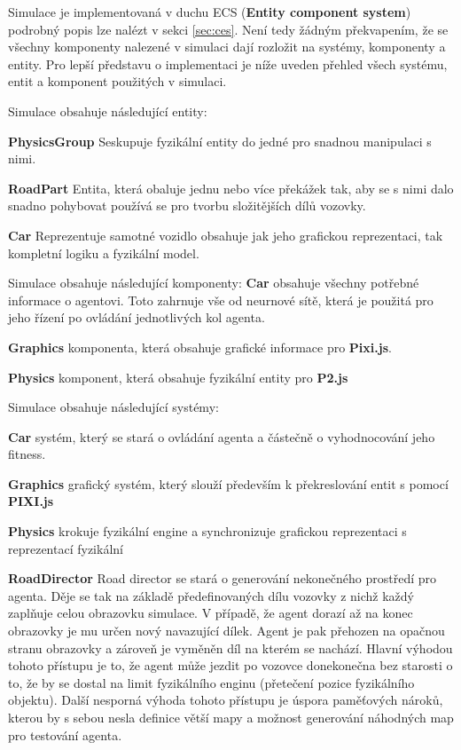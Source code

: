 \label{sec:ECS}
Simulace je implementovaná v duchu ECS (\textbf{Entity component system}) podrobný popis lze nalézt v sekci \ref{sec:ces}. Není tedy žádným překvapením, že se všechny komponenty nalezené v simulaci dají rozložit na systémy, komponenty a entity. Pro lepší představu o implementaci je níže uveden přehled všech systému, entit a komponent použitých v simulaci.

Simulace obsahuje následující entity:

\textbf{PhysicsGroup} Seskupuje fyzikální entity do jedné pro snadnou manipulaci s nimi.

\textbf{RoadPart} Entita, která obaluje jednu nebo více překážek tak, aby se s nimi dalo snadno pohybovat používá se pro tvorbu složitějších dílů vozovky.

\textbf{Car} Reprezentuje samotné vozidlo obsahuje jak jeho grafickou reprezentaci, tak kompletní logiku a fyzikální model.
 
Simulace obsahuje následující komponenty:
\textbf{Car} obsahuje všechny potřebné informace o agentovi. Toto zahrnuje vše od neurnové sítě, která je použitá pro jeho řízení po ovládání jednotlivých kol agenta.

\textbf{Graphics} komponenta, která obsahuje grafické informace pro \textbf{Pixi.js}.

\textbf{Physics} komponent, která obsahuje fyzikální entity pro \textbf{P2.js}

Simulace obsahuje následující systémy:

\textbf{Car} systém, který se stará o ovládání agenta a částečně o vyhodnocování jeho fitness.

\textbf{Graphics} grafický systém, který slouží především k překreslování entit s pomocí \textbf{PIXI.js}

\textbf{Physics} krokuje fyzikální engine a synchronizuje grafickou reprezentaci s reprezentací fyzikální

\textbf{RoadDirector} Road director se stará o generování nekonečného prostředí pro agenta. Děje se tak na základě předefinovaných dílu vozovky z nichž každý zaplňuje celou obrazovku simulace. V případě, že agent dorazí až na konec obrazovky je mu určen nový navazující dílek. Agent je pak přehozen na opačnou stranu obrazovky a zároveň je vyměněn díl na kterém se nachází.
Hlavní výhodou tohoto přístupu je to, že agent může jezdit po vozovce donekonečna bez starosti o to, že by se dostal na limit fyzikálního enginu (přetečení pozice fyzikálního objektu). Další nesporná výhoda tohoto přístupu je úspora paměťových nároků, kterou by s sebou nesla definice větší mapy a možnost generování náhodných map pro testování agenta.

